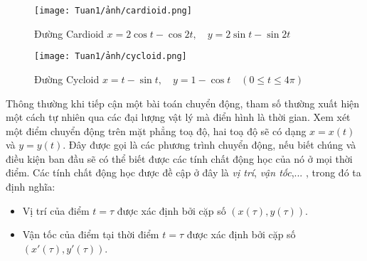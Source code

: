 \begin{figure}[H]
    \centering
    \texttt{[image: Tuan1/ảnh/cardioid.png]}
    \caption{Đường Cardioid\newline \hspace*{1em} $x = 2\cos t - \cos 2t,\quad y = 2\sin t - \sin 2t$}
\end{figure}

\begin{figure}[H]
    \centering
    \texttt{[image: Tuan1/ảnh/cycloid.png]}
    \caption{Đường Cycloid\newline \hspace*{1em} $x=t-\sin t,\quad y=1-\cos t\quad (0\leq t\leq 4\pi)$}
\end{figure}

Thông thường khi tiếp cận một bài toán chuyển động, tham số thường xuất hiện một cách tự nhiên qua các đại lượng vật lý mà điển hình là thời gian.\newline
Xem xét một điểm chuyển động trên mặt phẳng toạ độ,  hai toạ độ sẽ có dạng $x=x(t)$ và $y=y(t)$. Đây được gọi là các phương trình chuyển động, nếu biết chúng và điều kiện ban đầu sẽ có thể biết được các tính chất động học của nó ở mọi thời điểm. Các tính chất động học được đề cập ở đây là \emph{vị trí}, \emph{vận tốc},... , trong đó ta định nghĩa:
\begin{itemize}
    \item Vị trí của điểm $t=\tau$ được xác định bởi cặp số $(x(\tau),y(\tau))$.
    \item Vận tốc của điểm tại thời điểm $t=\tau$ được xác định bởi cặp số $(x'(\tau),y'(\tau))$.
\end{itemize}